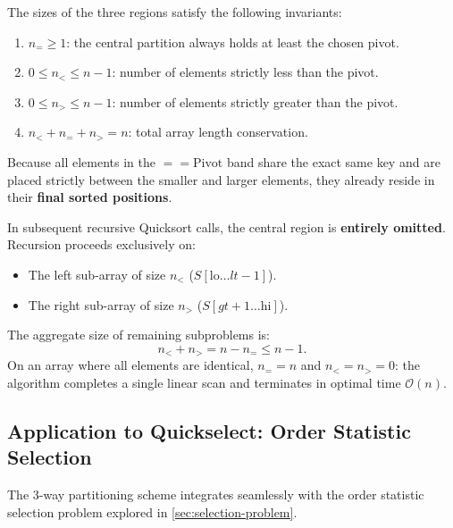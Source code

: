 \begin{property}
\label{prop:3way-dimensional-invariants}
The sizes of the three regions satisfy the following invariants:
\begin{enumerate}
  \item $n_= \ge 1$: the central partition always holds at least the chosen pivot.
  \item $0 \le n_< \le n - 1$: number of elements strictly less than the pivot.
  \item $0 \le n_> \le n - 1$: number of elements strictly greater than the pivot.
  \item $n_< + n_= + n_> = n$: total array length conservation.
\end{enumerate}
\end{property}

\begin{theorem}
\label{thm:central-region-exclusion}
Because all elements in the $== \text{Pivot}$ band share the exact same key and are placed strictly between the smaller and larger elements, they already reside in their \textbf{final sorted positions}.

In subsequent recursive Quicksort calls, the central region is \textbf{entirely omitted}. Recursion proceeds exclusively on:
\begin{itemize}
  \item The left sub-array of size $n_<$ ($S[\text{lo} \dots lt - 1]$).
  \item The right sub-array of size $n_>$ ($S[gt + 1 \dots \text{hi}]$).
\end{itemize}
The aggregate size of remaining subproblems is:
\begin{equation}
  n_< + n_> = n - n_= \le n - 1.
\end{equation}
On an array where all elements are identical, $n_= = n$ and $n_< = n_> = 0$: the algorithm completes a single linear scan and terminates in optimal time $\mathcal{O}(n)$.
\end{theorem}

\subsection{Application to Quickselect: Order Statistic Selection}
\label{subsec:3way-quickselect}

The 3-way partitioning scheme integrates seamlessly with the order statistic selection problem explored in \autoref{sec:selection-problem}.

